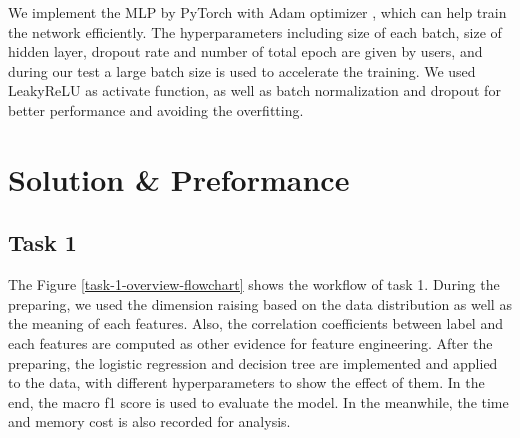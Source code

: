 \documentclass[11pt]{article}
\begin{document}
We implement the MLP by PyTorch with Adam optimizer \cite{kingma2014adam} , which can help train the network efficiently. The hyperparameters including size of each batch, size of hidden layer, dropout rate and number of total epoch are given by users, and during our test a large batch size is used to accelerate the training. We used LeakyReLU as activate function, as well as batch normalization and dropout for better performance and avoiding the overfitting.

\section{Solution \& Preformance}

\subsection{Task 1}

The Figure \ref{task-1-overview-flowchart} shows the workflow of task 1. During the preparing, we used the dimension raising based on the data distribution as well as the meaning of each features. Also, the correlation coefficients between label and each features are computed as other evidence for feature engineering. After the preparing, the logistic regression and decision tree are implemented and applied to the data, with different hyperparameters to show the effect of them. In the end, the macro f1 score is used to evaluate the model. In the meanwhile, the time and memory cost is also recorded for analysis.
\end{document}

